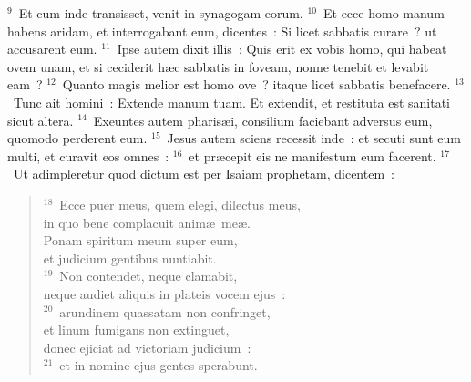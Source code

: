 ${}^{9}$~Et cum inde transisset, venit in synagogam eorum.
${}^{10}$~Et ecce homo manum habens aridam, et interrogabant eum, dicentes~: Si licet sabbatis curare~? ut accusarent eum.
${}^{11}$~Ipse autem dixit illis~: Quis erit ex vobis homo, qui habeat ovem unam, et si ceciderit h\ae c sabbatis in foveam, nonne tenebit et levabit eam~?
${}^{12}$~Quanto magis melior est homo ove~? itaque licet sabbatis benefacere.
${}^{13}$~Tunc ait homini~: Extende manum tuam. Et extendit, et restituta est sanitati sicut altera.
${}^{14}$~Exeuntes autem pharis\ae i, consilium faciebant adversus eum, quomodo perderent eum.
${}^{15}$~Jesus autem sciens recessit inde~: et secuti sunt eum multi, et curavit eos omnes~:
${}^{16}$~et pr\ae cepit eis ne manifestum eum facerent.
${}^{17}$~Ut adimpleretur quod dictum est per Isaiam prophetam, dicentem~:
\begin{flushleft}\begin{verse}${}^{18}$~Ecce puer meus, quem elegi, dilectus meus,\\ in quo bene complacuit anim\ae\ me\ae .\\ Ponam spiritum meum super eum,\\ et judicium gentibus nuntiabit.\\
${}^{19}$~Non contendet, neque clamabit,\\ neque audiet aliquis in plateis vocem ejus~:\\
${}^{20}$~arundinem quassatam non confringet,\\ et linum fumigans non extinguet,\\ donec ejiciat ad victoriam judicium~:\\
${}^{21}$~et in nomine ejus gentes sperabunt.\end{verse}\end{flushleft}


